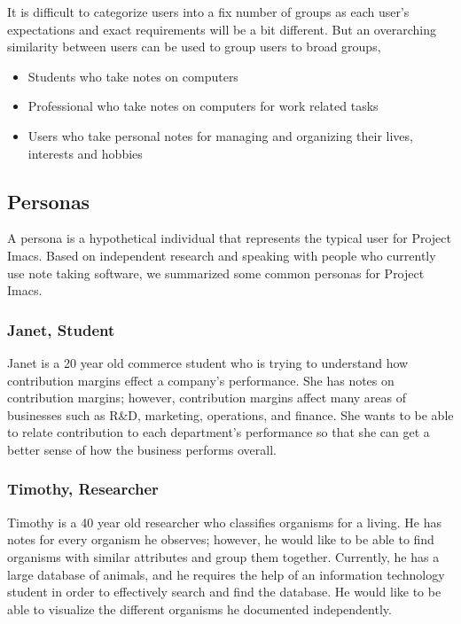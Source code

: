 \documentclass{article}
\begin{document}
It is difficult to categorize users into a fix number of groups as each user's
expectations and exact requirements will be a bit different. But an overarching similarity
between users can be used to group users to broad groups,

\begin{itemize}
    \item Students who take notes on computers
    \item Professional who take notes on computers for work related tasks
    \item Users who take personal notes for managing and organizing their lives, interests
        and hobbies
\end{itemize}

\subsection{Personas}
A persona is a hypothetical individual that represents the typical user for Project Imacs. Based on independent research and speaking with people who currently use note taking software, we summarized some common personas for Project Imacs.

\subsubsection{Janet, Student}
Janet is a 20 year old commerce student who is trying to understand how contribution margins effect a company's performance. She has notes on contribution margins; however, contribution margins affect many areas of businesses such as R\&D, marketing, operations, and finance. She wants to be able to relate contribution to each department's performance so that she can get a better sense of how the business performs overall.

\subsubsection{Timothy, Researcher}
Timothy is a 40 year old researcher who classifies organisms for a living. He has notes for every organism he observes; however, he would like to be able to find organisms with similar attributes and group them together. Currently, he has a large database of animals, and he requires the help of an information technology student in order to effectively search and find the database. He would like to be able to visualize the different organisms he documented independently.
\end{document}
